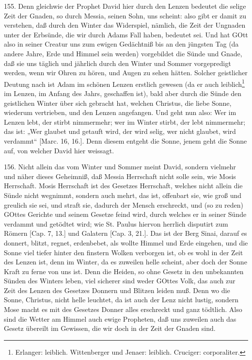 155. Denn gleichwie der Prophet David hier durch den Lenzen bedeutet die selige Zeit der Gnaden, so durch Messia, seinen Sohn, uns scheint: also gibt er damit zu verstehen, daß durch den Winter das Widerspiel, nämlich, die Zeit der Ungnaden unter der Erbsünde, die wir durch Adams Fall haben, bedeutet sei. Und hat GOtt also in seiner Creatur uns zum ewigen Gedächtniß bis an den jüngsten Tag (da andere Jahre, Erde und Himmel sein werden) vorgebildet die Sünde und Gnade, daß sie uns täglich und jährlich durch den Winter und Sommer vorgepredigt werden, wenn wir Ohren zu hören, und Augen zu sehen hätten. Solcher geistlicher Deutung nach ist Adam im schönen Lenzen erstlich gewesen (da er auch leiblich\footnote{Erlanger: leiblich. Wittenberger und Jenaer: leiblich. Cruciger: corporaliter.} im Lenzen, im Anfang des Jahrs, geschaffen ist), bald aber durch die Sünde den geistlichen Winter über sich gebracht hat, welchen Christus, die liebe Sonne, wiederum vertrieben, und den Lenzen angefangen. Und geht nun also: Wer im Lenzen lebt, der stirbt nimmermehr; wer im Winter stirbt, der lebt nimmermehr; das ist: „Wer glaubet und getauft wird, der wird selig, wer nicht glaubet, wird verdammt“ [Marc. 16, 16.]. Denn diesem entgeht die Sonne, jenem geht die Sonne auf, von welcher David hier weissagt.

156. Nicht allein das vom Winter und Sommer meint David, sondern vielmehr und näher dieses Geheimniß, daß Messia Herrschaft nicht solle sein, wie Mosis Herrschaft. Mosis Herrschaft ist des Gesetzes Herrschaft, welches nicht allein die Sünde nicht wegnimmt, sondern auch mehrt, das ist, offenbart sie, wie groß und greulich sie sei, und straft sie, dadurch der Mensch erschreckt, und (so zu reden) GOttes Gerichte und seinem Gesetze feind wird, durch welches er in seiner Sünde verdammt und getödtet wird; wie St. Paulus hiervon herrlich disputirt zum Römern [Cap. 7, 13.] und Galatern [Cap. 3, 21.]. Das ist der Berg Sinai, darauf es donnert, blitzt, regnet, erdenbebet, als wollte Himmel und Erde eingehen, und die Sonne viel tiefer hinter den finstern Wolken verborgen ist, ob es wohl in der Zeit des Lenzen ist, denn im Winter, da es zuweilen helle scheint, aber doch der Sonne Kraft zu ferne von uns ist. Denn die Heiden, so ohne Gesetz in den unbekannten Sünden des Winters leben, viel sicherer sind weder GOttes Volk, das auch zur Zeit des Lenzen des Gesetzes Donnern und Blitzen leiden muß. Denn wo die Sonne, Christus, nicht helle leuchtet, da ist auch der Lenz nicht lustig, sondern Mose macht es mit des Gesetzes Donner alles erschreckt und ganz tödtlich. Also sind die Wetter am Himmel auch ewige Propheten, daß uns zuweilen auch das Gesetz übereilt im Gewissen, die wir doch in der Zeit der Gnaden sind.

